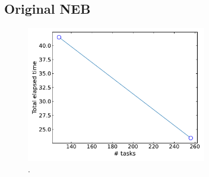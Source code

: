 \documentclass[10pt]{article}
\begin{document}
\subsection{Original NEB}


\begin{figure}[tb]
	\centering
	\includegraphics[width=0.7\textwidth]{Ramses_strong.pdf}
	\caption{.}
	\label{fig::X1}
\end{figure}
\end{document}
